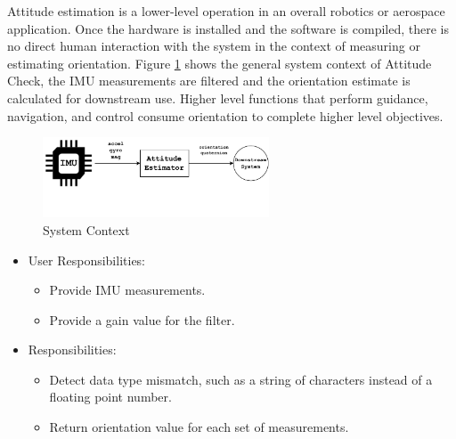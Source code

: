 \documentclass[12pt]{article}
\begin{document}
Attitude estimation is a lower-level operation in an overall robotics or aerospace application. Once
the hardware is installed and the software is compiled, there is no direct human interaction with
the system in the context of measuring or estimating orientation. Figure \ref{fig:systemContext}
shows the general system context of Attitude Check, the IMU measurements are filtered and the
orientation estimate is calculated for downstream use. Higher level functions that perform guidance,
navigation, and control consume orientation to complete higher level objectives.

\begin{figure}[h!]
    \centerline{\includegraphics[width=0.6\textwidth, trim={0 2cm 0
    0},clip]{cas741_attitudeCheck.pdf}}
    \caption{System Context}
    \label{fig:systemContext} 
\end{figure}


\begin{itemize}
    \item User Responsibilities:
\begin{itemize}
    \item Provide IMU measurements.
    \item Provide a gain value for the filter.
\end{itemize}
    \item \progname{} Responsibilities:
\begin{itemize}
    \item Detect data type mismatch, such as a string of characters instead of a floating point
  number.
    \item Return orientation value for each set of measurements.
\end{itemize}
\end{itemize}
\end{document}
